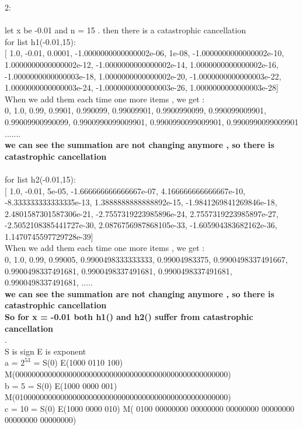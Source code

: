 \documentclass[18pt]{article}
\begin{document}
2:\\
\\
    let x be -0.01 and n = 15 . then there is a catastrophic cancellation\\
    for list h1(-0.01,15):\\
    $[$ 1.0, -0.01, 0.0001, -1.0000000000000002e-06, 1e-08, -1.0000000000000002e-10, 1.0000000000000002e-12, -1.0000000000000002e-14,
    1.0000000000000002e-16, -1.0000000000000003e-18, 1.0000000000000002e-20, -1.0000000000000003e-22, 1.0000000000000003e-24, -1.0000000000000003e-26, 1.0000000000000003e-28]\\
    When we add them each time one more items , we get :\\
    0, 1.0, 0.99, 0.9901, 0.990099, 0.99009901, 0.9900990099, 0.990099009901, 0.99009900990099, 0.9900990099009901, 0.9900990099009901, 0.9900990099009901 .......\\
    \textbf{we can see the summation are  not changing anymore , so there is catastrophic cancellation} \\
\\
    for list h2(-0.01,15):\\
    $[$ 1.0, -0.01, 5e-05, -1.666666666666667e-07, 4.166666666666667e-10, -8.333333333333335e-13, 1.3888888888888892e-15, -1.9841269841269846e-18,
    2.4801587301587306e-21, -2.7557319223985896e-24, 2.7557319223985897e-27, -2.5052108385441727e-30, 2.0876756987868105e-33, -1.605904383682162e-36, 1.1470745597729728e-39]\\
    When we add them each time one more items , we get :\\
    0, 1.0, 0.99, 0.99005, 0.9900498333333333, 0.99004983375, 0.9900498337491667, 0.9900498337491681, 0.9900498337491681, 0.9900498337491681, 0.9900498337491681, .....\\
    \textbf{we can see the summation are  not changing anymore , so there is catastrophic cancellation} \\
    \textbf{So for x  = -0.01  both h1() and h2()  suffer from catastrophic cancellation}\\
.\\
S is sign  E is exponent \\
a = $2^{53}$  = S(0) E(1000 0110 100)
M(0000000000000000000000000000000000000000000000000000) \\
b = 5 =  S(0) E(1000 0000 001)
M(0100000000000000000000000000000000000000000000000000)   \\
c = 10  = S(0) E(1000 0000 010)
M( 0100 00000000 00000000 00000000 00000000 00000000 00000000)        \\
\end{document}
